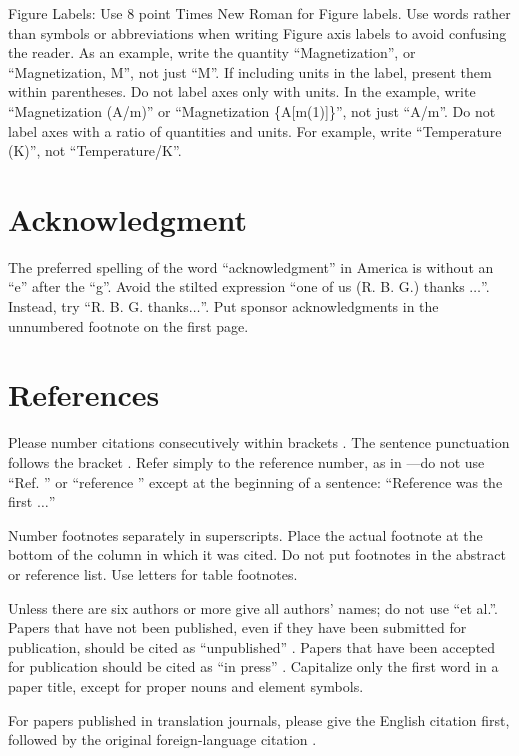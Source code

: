 \documentclass[conference]{IEEEtran}
\begin{document}
Figure Labels: Use 8 point Times New Roman for Figure labels. Use words 
rather than symbols or abbreviations when writing Figure axis labels to 
avoid confusing the reader. As an example, write the quantity 
``Magnetization'', or ``Magnetization, M'', not just ``M''. If including 
units in the label, present them within parentheses. Do not label axes only 
with units. In the example, write ``Magnetization (A/m)'' or ``Magnetization 
\{A[m(1)]\}'', not just ``A/m''. Do not label axes with a ratio of 
quantities and units. For example, write ``Temperature (K)'', not 
``Temperature/K''.

\section*{Acknowledgment}

The preferred spelling of the word ``acknowledgment'' in America is without 
an ``e'' after the ``g''. Avoid the stilted expression ``one of us (R. B. 
G.) thanks $\ldots$''. Instead, try ``R. B. G. thanks$\ldots$''. Put sponsor 
acknowledgments in the unnumbered footnote on the first page.

\section*{References}

Please number citations consecutively within brackets . The 
sentence punctuation follows the bracket . Refer simply to the reference 
number, as in ---do not use ``Ref. '' or ``reference '' except at 
the beginning of a sentence: ``Reference  was the first $\ldots$''

Number footnotes separately in superscripts. Place the actual footnote at 
the bottom of the column in which it was cited. Do not put footnotes in the 
abstract or reference list. Use letters for table footnotes.

Unless there are six authors or more give all authors' names; do not use 
``et al.''. Papers that have not been published, even if they have been 
submitted for publication, should be cited as ``unpublished'' . Papers 
that have been accepted for publication should be cited as ``in press'' . 
Capitalize only the first word in a paper title, except for proper nouns and 
element symbols.

For papers published in translation journals, please give the English 
citation first, followed by the original foreign-language citation .



\end{document}
